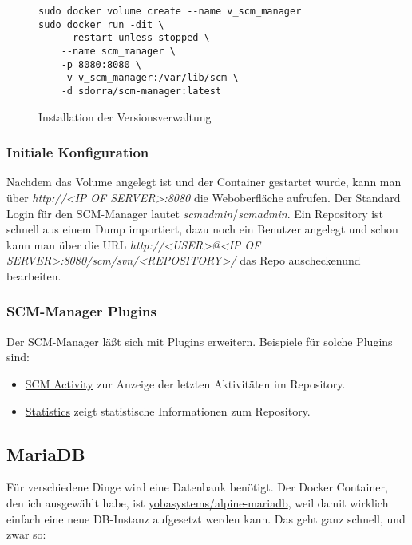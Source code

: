 \documentclass[12pt,a4paper]{article}
\newcommand{\code}[1]{\textit{#1}}
\begin{document}
\begin{figure}[H]
\begin{lstlisting}
sudo docker volume create --name v_scm_manager
sudo docker run -dit \
    --restart unless-stopped \
    --name scm_manager \
    -p 8080:8080 \
    -v v_scm_manager:/var/lib/scm \
    -d sdorra/scm-manager:latest
\end{lstlisting}
\caption{Installation der Versionsverwaltung}\label{fig:Installation der Versionsverwaltung}
\end{figure}

\subsubsection{Initiale Konfiguration}
Nachdem das Volume angelegt ist und der Container gestartet wurde, kann man über \code{http://<IP OF SERVER>:8080} die
Weboberfläche aufrufen. Der Standard Login für den SCM-Manager lautet \code{scmadmin}/\code{scmadmin}. Ein Repository
ist schnell aus einem Dump importiert, dazu noch ein Benutzer angelegt und schon kann man über die URL\linebreak
\code{http://<USER>@<IP OF SERVER>:8080/scm/svn/<REPOSITORY>/} das Repo auschecken\linebreak und bearbeiten.

\subsubsection{SCM-Manager Plugins}
Der SCM-Manager läßt sich mit Plugins erweitern. Beispiele für solche Plugins sind:

\begin{itemize}
\item \href{https://bitbucket.org/sdorra/scm-activity-plugin/src/default/}{SCM Activity} zur Anzeige der letzten Aktivitäten im Repository.
\item \href{https://bitbucket.org/sdorra/scm-statistic-plugin/src/default/}{Statistics} zeigt statistische Informationen zum Repository.
\end{itemize}

\subsection{MariaDB}\label{sub:MariaDB}
Für verschiedene Dinge wird eine Datenbank benötigt. Der Docker Container, den ich ausgewählt habe, ist
\href{https://hub.docker.com/r/yobasystems/alpine-mariadb}{yobasystems/alpine-mariadb}, weil damit wirklich einfach eine
neue DB-Instanz aufgesetzt werden kann. Das geht ganz schnell, und zwar so:
\end{document}
